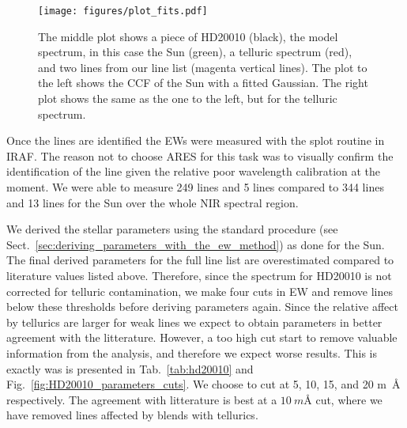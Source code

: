 \documentclass{aa}
\begin{document}
\begin{figure}[tbp!]
    \centering
    \texttt{[image: figures/plot\_fits.pdf]}
    \caption{The middle plot shows a piece of HD20010 (black), the model
    spectrum, in this case the Sun (green), a telluric spectrum (red), and two
    lines from our line list (magenta vertical lines). The plot to the left
    shows the CCF of the Sun with a fitted Gaussian. The right plot shows the
    same as the one to the left, but for the telluric spectrum.}
    \label{fig:plot_fits}
\end{figure}

Once the lines are identified the EWs were measured with the splot
routine in IRAF. The reason not to choose ARES for this task was to
visually confirm the identification of the line given the relative
poor wavelength calibration at the moment. We were able to measure 249
 lines and 5  lines compared to 344 
lines and 13  lines for the Sun over the whole NIR spectral
region.

We derived the stellar parameters using the standard procedure
(see Sect.~\ref{sec:deriving_parameters_with_the_ew_method}) as
done for the Sun. The final derived parameters for the full line
list are overestimated compared to literature values listed above.
Therefore, since the spectrum for HD20010 is not corrected for
telluric contamination, we make four cuts in EW and remove lines below
these thresholds before deriving parameters again. Since the relative
affect by tellurics are larger for weak lines we expect to obtain
parameters in better agreement with the litterature. However, a too
high cut start to remove valuable information from the analysis, and
therefore we expect worse results. This is exactly was is presented in
Tab.~\ref{tab:hd20010} and Fig.~\ref{fig:HD20010_parameters_cuts}. We
choose to cut at 5, 10, 15, and 20 \si{m\angstrom} respectively. The
agreement with litterature is best at a $\SI{10}{m\angstrom}$ cut,
where we have removed lines affected by blends with tellurics.
\end{document}
